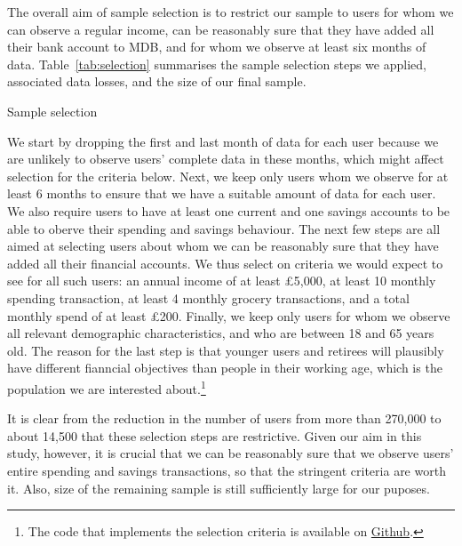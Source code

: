 The overall aim of sample selection is to restrict our sample to users for whom
we can observe a regular income, can be reasonably sure that they have added
all their bank account to MDB, and for whom we observe at least six months of
data. Table~\ref{tab:selection} summarises the sample selection steps we
applied, associated data losses, and the size of our final sample.

\begin{table}[ht]
\centering\small
\caption{Sample selection}\label{tab:selection}

\end{table}

We start by dropping the first and last month of data for each user because we
are unlikely to observe users' complete data in these months, which might
affect selection for the criteria below. Next, we keep only users whom we
observe for at least 6 months to ensure that we have a suitable amount of data
for each user. We also require users to have at least one current and one
savings accounts to be able to oberve their spending and savings behaviour. The
next few steps are all aimed at selecting users about whom we can be reasonably
sure that they have added all their financial accounts. We thus select on
criteria we would expect to see for all such users: an annual income of at
least \pounds5,000, at least 10 monthly spending transaction, at least 4
monthly grocery transactions, and a total monthly spend of at least \pounds200.
Finally, we keep only users for whom we observe all relevant demographic
characteristics, and who are between 18 and 65 years old. The reason for the
last step is that younger users and retirees will plausibly have different
fianncial objectives than people in their working age, which is the population
we are interested about.\footnote{The code that implements the selection
criteria is available on
\href{https://github.com/fabiangunzinger/entropy/blob/c49c9c34c96d073725afd3a1494458a388d00051/src/data/selectors.py}{Github}.}

It is clear from the reduction in the number of users from more than 270,000 to
about 14,500 that these selection steps are restrictive. Given our aim in this
study, however, it is crucial that we can be reasonably sure that we observe
users' entire spending and savings transactions, so that the stringent criteria
are worth it. Also, size of the remaining sample is still sufficiently large
for our puposes.


